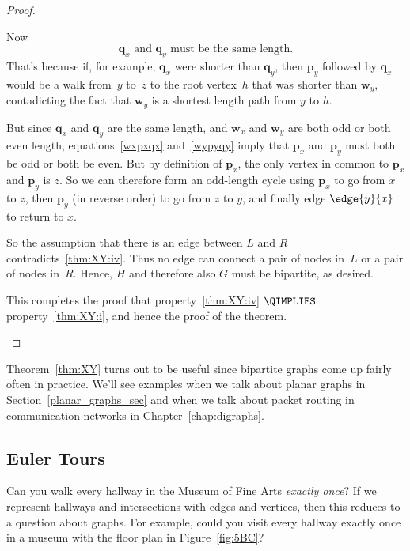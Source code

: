 \begin{editingnotes}
\begin{proof}
\begin{description}
\begin{figure}
\label{fig:XY3}

\end{figure}

Now
\[
\mathbf{q}_x \text{ and }\mathbf{q}_y\text{ must be the same length}.
\]
That's because if, for example, $\mathbf{q}_x$ were shorter than
$\mathbf{q}_y$, then $\mathbf{p}_y$ followed by $\mathbf{q}_x$ would
be a walk from~$y$ to~$z$ to the root vertex~$h$ that was shorter than
$\mathbf{w}_y$, contadicting the fact that $\mathbf{w}_y$ is a
shortest length path from $y$ to $h$.

But since $\mathbf{q}_x$ and $\mathbf{q}_y$ are the same length, and
$\mathbf{w}_x$ and $\mathbf{w}_y$ are both odd or both even length,
equations~\eqref{wxpxqx} and~\eqref{wypyqy} imply that $\mathbf{p}_x$
and $\mathbf{p}_y$ must both be odd or both be even.  But by
definition of $\mathbf{p}_x$, the only vertex in common to
$\mathbf{p}_x$ and $\mathbf{p}_y$ is $z$.  So we can therefore form an
odd-length cycle using $\mathbf{p}_x$ to go from $x$ to $z$, then
$\mathbf{p}_y$ (in reverse order) to go from $z$ to $y$, and finally
edge $\edge{y}{x}$ to return to $x$.

So the assumption that there is an edge between $L$ and $R$
contradicts~\ref{thm:XY:iv}.  Thus no edge can connect a pair of nodes
in~$L$ or a pair of nodes in~$R$.  Hence, $H$ and therefore also $G$
must be bipartite, as desired.

This completes the proof that property~\ref{thm:XY:iv} $\QIMPLIES$
property~\ref{thm:XY:i}, and hence the proof of the theorem.  \qedhere
\end{description}

\end{proof}

Theorem~\ref{thm:XY} turns out to be useful since bipartite graphs
come up fairly often in practice.  We'll see examples when we talk
about planar graphs in Section~\ref{planar_graphs_sec} and when we
talk about packet routing in communication networks in
Chapter~\ref{chap:digraphs}.

\end{editingnotes}

\subsection{Euler Tours}

Can you walk every hallway in the Museum of Fine Arts \emph{exactly
  once}?  If we represent hallways and intersections with edges and
vertices, then this reduces to a question about graphs.  For example,
could you visit every hallway exactly once in a museum with the
floor plan in Figure~\ref{fig:5BC}?

